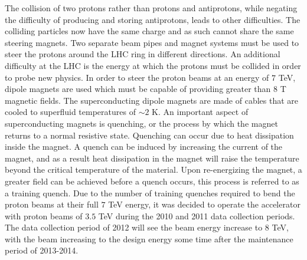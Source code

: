 The collision of two protons rather than protons and antiprotons, while negating the difficulty of producing and storing antiprotons, leads to other difficulties.
The colliding particles now have the same charge and as such cannot share the same steering magnets. 
Two separate beam pipes and magnet systems must be used to steer the protons around the LHC ring in different directions.
An additional difficulty at the LHC is the energy at which the protons must be collided in order to probe new physics.
In order to steer the proton beams at an energy of $7$ TeV, dipole magnets are used which must be capable of providing greater than $8$ T magnetic fields.
The superconducting dipole magnets are made of  cables that are cooled to superfluid temperatures of $\sim2$ K.
An important aspect of superconducting magnets is quenching, or the process by which the magnet returns to a normal resistive state.
Quenching can occur due to heat dissipation inside the magnet.
A quench can be induced by increasing the current of the magnet, and as a result heat dissipation in the magnet will raise the temperature beyond the critical temperature of the material.
Upon re-energizing the magnet, a greater field can be achieved before a quench occurs, this process is referred to as a training quench.
Due to the number of training quenches required to bend the proton beams at their full $7$ TeV energy, it was decided to operate the accelerator with proton beams of $3.5$ TeV during the 2010 and 2011 data collection periods.
The data collection period of 2012 will see the beam energy increase to $8$ TeV, with the beam increasing to the design energy some time after the maintenance period of 2013-2014.


